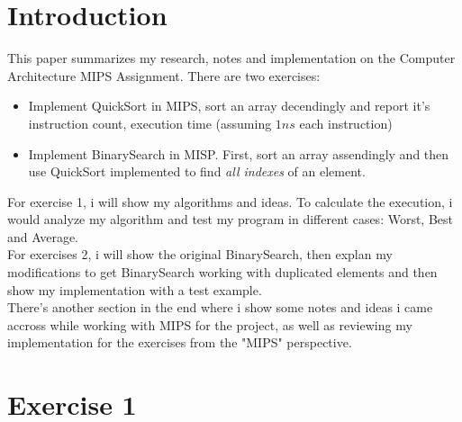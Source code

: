 \documentclass[a4paper]{article}
\begin{document}

\newpage
\tableofcontents
\newpage
\section{Introduction}
This paper summarizes my research, notes and implementation on the Computer Architecture MIPS Assignment.
There are two exercises:
\begin{itemize}
\item Implement QuickSort in MIPS, sort an array decendingly and report it's instruction count, execution time (assuming $1ns$ each instruction)
\item Implement BinarySearch in MISP. First, sort an array assendingly and then use QuickSort implemented to find \emph{all indexes} of an element.
\end{itemize}
For exercise 1, i will show my algorithms and ideas. To calculate the execution, i would analyze my algorithm and test my program in different cases: Worst, Best and Average.\\
For exercises 2, i will show the original BinarySearch, then explan my modifications to get BinarySearch working with duplicated elements and then show my implementation with a test example.\\
There's another section in the end where i show some notes and ideas i came accross while working with MIPS for the project, as well as reviewing my implementation for the exercises from the "MIPS" perspective.
\section{Exercise 1}
\end{document}
